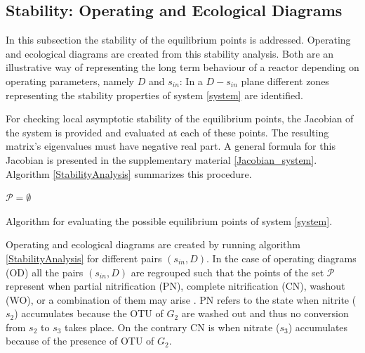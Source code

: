 \documentclass[3p,times]{article}
\newcommand{\N}{\mathbb{N}}
\newcommand{\R}{\mathbb{R}}
\begin{document}
\subsection{Stability: Operating and Ecological Diagrams}

In this subsection the stability of the equilibrium points is addressed. Operating and ecological diagrams are created from this stability analysis. Both are an illustrative way of representing the long term behaviour of a reactor depending on operating parameters, namely $D$ and $s_{in}$: In a $D-s_{in}$ plane different zones representing the stability properties of system \eqref{system} are identified. 

For checking local asymptotic stability of the equilibrium points, the Jacobian of the system is provided and evaluated at each of these points. The resulting matrix's eigenvalues must have negative real part. A general formula for this Jacobian is presented in the supplementary material \eqref{Jacobian_system}. Algorithm \ref{StabilityAnalysis} summarizes this procedure.

\begin{algorithm}[H]
	\KwData{$A \in M_{n\times n}(\R)$, $D, s_{in}, \bar{\mu}_i,K_i, k_i,  \in \R \, i\in [n], $, $n_1, n_2 \in \N$}
	$\mathcal{P} = \emptyset$ \\
	\label{StabilityAnalysis}
	\caption{Algorithm for evaluating the possible equilibrium points of system \eqref{system}.}
\end{algorithm}


Operating and ecological diagrams are created by running algorithm \ref{StabilityAnalysis} for different pairs $(s_{in},D)$. In the case of operating diagrams\cite{lobry2017chemostat} (OD) all the pairs $(s_{in},D)$ are regrouped such that the points of the set $\mathcal{P}$ represent when partial nitrification (PN), complete nitrification (CN), washout (WO), or a combination of them may arise \cite{KHIN2004519}. PN refers to the state when nitrite ($s_2$) accumulates because the OTU of $G_2$ are washed out and thus no conversion from $s_2$  to $s_3$ takes place. On the contrary CN is when nitrate ($s_3$) accumulates because of the presence of OTU of $G_2$. 
\end{document}
